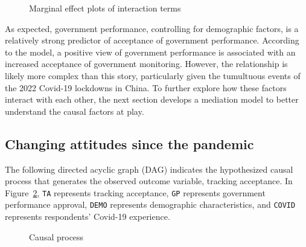 \documentclass[
  letterpaper,
  DIV=11,
  numbers=noendperiod]{scrartcl}
\begin{document}
\begin{figure}
{{}


}

\caption{\label{fig-marginplotperform}Marginal effect plots of
interaction terms}

\end{figure}%

As expected, government performance, controlling for demographic
factors, is a relatively strong predictor of acceptance of government
performance. According to the model, a positive view of government
performance is associated with an increased acceptance of government
monitoring. However, the relationship is likely more complex than this
story, particularly given the tumultuous events of the 2022 Covid-19
lockdowns in China. To further explore how these factors interact with
each other, the next section develops a mediation model to better
understand the causal factors at play.

\subsection{Changing attitudes since the
pandemic}\label{changing-attitudes-since-the-pandemic}

The following directed acyclic graph (DAG) indicates the hypothesized
causal process that generates the observed outcome variable, tracking
acceptance. In Figure~\ref{fig-dag}, \texttt{TA} represents tracking
acceptance, \texttt{GP} represents government performance approval,
\texttt{DEMO} represents demographic characteristics, and \texttt{COVID}
represents respondents' Covid-19 experience.

\begin{figure}


\caption{\label{fig-dag}Causal process}

\end{figure}%
\end{document}
